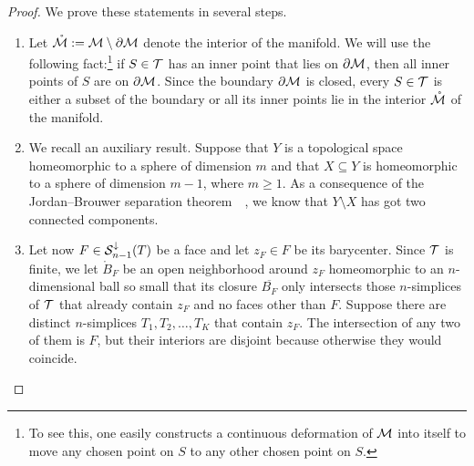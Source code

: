 \documentclass[10pt,a4paper]{article}
\begin{document}
\begin{proof}
    We prove these statements in several steps.
    \begin{enumerate}
    \item 
    Let $\mathring {{\mathcal M}} := {\mathcal M} \setminus \partial {\mathcal M}$ denote the interior of the manifold. 
    We will use the following fact:\footnote{To see this, one easily constructs a continuous deformation of ${\mathcal M}$ into itself to move any chosen point on $S$ to any other chosen point on $S$.} if $S \in {\mathcal T}$ has an inner point that lies on $\partial {\mathcal M}$, then all inner points of $S$ are on $\partial {\mathcal M}$. 
    Since the boundary $\partial {\mathcal M}$ is closed, every $S \in {\mathcal T}$ is either a subset of the boundary or all its inner points lie in the interior $\mathring {{\mathcal M}}$ of the manifold. 
    
    \item 
    We recall an auxiliary result.
    Suppose that $Y$ is a topological space homeomorphic to a sphere of dimension $m$ and that $X \subseteq Y$ is homeomorphic to a sphere of dimension $m-1$, where $m \geq 1$. 
    As a consequence of the Jordan--Brouwer separation theorem~\cite[Corollary IV.5.24]{mayer1989algebraische}~\cite[Corollary VIII.6.4]{massey1981algebraic}, 
    we know that $Y \setminus X$ has got two connected components.
    
    
    \item
    Let now $F \in {\mathcal S}^{\downarrow}_{n-1}(T)$ be a face and let $z_F \in F$ be its barycenter. 
    Since ${\mathcal T}$ is finite, we let $\mathring B_F$ be an open neighborhood around $z_F$ 
    homeomorphic to an $n$-dimensional ball 
    so small that its closure $\overline{B_F}$ only intersects those $n$-simplices of ${\mathcal T}$ that already contain $z_F$ and no faces other than $F$.
    Suppose there are distinct $n$-simplices $T_1, T_2, \dots, T_K$ that contain $z_F$. 
    The intersection of any two of them is $F$, but their interiors are disjoint because otherwise they would coincide. 
    

\end{enumerate}
\end{proof}
\end{document}
